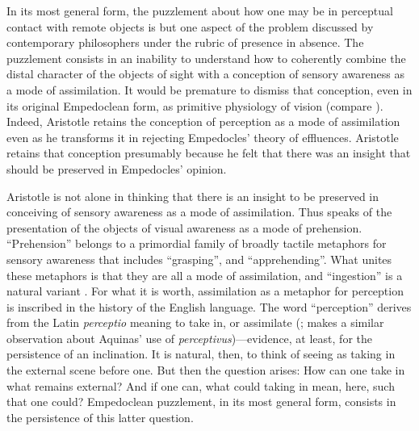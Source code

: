 In its most general form, the puzzlement about how one may be in perceptual contact with remote objects is but one aspect of the problem discussed by contemporary philosophers under the rubric of presence in absence. The puzzlement consists in an inability to understand how to coherently combine the distal character of the objects of sight with a conception of sensory awareness as a mode of assimilation. It would be premature to dismiss that conception, even in its original Empedoclean form, as primitive physiology of vision (compare \citealt[318 n106]{Cherniss:1935fk}). Indeed, Aristotle retains the conception of perception as a mode of assimilation even as he transforms it in rejecting Empedocles' theory of effluences. Aristotle retains that conception presumably because he felt that there was an insight that should be preserved in Empedocles' opinion. 

Aristotle is not alone in thinking that there is an insight to be preserved in conceiving of sensory awareness as a mode of assimilation. Thus \citet{Broad:1952kx} speaks of the presentation of the objects of visual awareness as a mode of prehension.  ``Prehension'' belongs to a primordial family of broadly tactile metaphors for sensory awareness that includes ``grasping'', and ``apprehending''. What unites these metaphors is that they are all a mode of assimilation, and ``ingestion'' is a natural variant \citep[see][7]{Johnston:2006uq,Price:1932fk}. For what it is worth, assimilation as a metaphor for perception is inscribed in the history of the English language. The word ``perception'' derives from the Latin \emph{perceptio} meaning to take in, or assimilate (\citealt[102]{Burnyeat:1979mv}; \citealt[51]{Pasnau:1997aa} makes a similar observation about Aquinas' use of \emph{perceptivus})---evidence, at least, for the persistence of an inclination. It is natural, then, to think of seeing as taking in the external scene before one. But then the question arises: How can one take in what remains external? And if one can, what could taking in mean, here, such that one could? Empedoclean puzzlement, in its most general form, consists in the persistence of this latter question.

